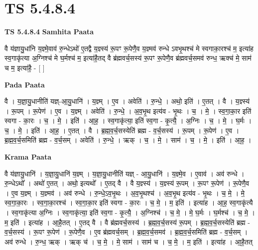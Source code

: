 \documentclass[17pt]{extarticle}
\begin{document}
\section{ TS 5.4.8.4 }

\textbf{TS 5.4.8.4 } \newline
\textbf{Samhita Paata} \newline

वै य॑ज्ञायु॒धा॑नि य॒ज्ञ्मे॒वाव॑ रु॒न्धेऽथो॑ ए॒तद्वै य॒ज्ञ्स्य॑ रू॒पꣳ रू॒पेणै॒व य॒ज्ञ्मव॑ रुन्धे ऽवभृ॒थश्च॑ मे स्वगाका॒रश्च॑ म॒ इत्या॑ह स्व॒गाकृ॑त्या अ॒ग्निश्च॑ मे घ॒र्मश्च॑ म॒ इत्या॑है॒तद् वै ब्र॑ह्मवर्च॒सस्य॑ रू॒पꣳ रू॒पेणै॒व ब्र॑ह्मवर्च॒समव॑ रुन्ध॒ ऋक्च॑ मे॒ साम॑ च म॒ इत्या॑है॒ - [  ] \newline

\textbf{Pada Paata} \newline

वै । य॒ज्ञा॒यु॒धानीति॑ यज्ञ्-आ॒यु॒धानि॑ । य॒ज्ञ्म् । ए॒व । अवेति॑ । रु॒न्धे॒ । अथो॒ इति॑ । ए॒तत् । वै । य॒ज्ञ्स्य॑ । रू॒पम् । रू॒पेण॑ । ए॒व । य॒ज्ञ्म् । अवेति॑ । रु॒न्धे॒ । अ॒व॒भृ॒थ इत्य॑व - भृ॒थः । च॒ । मे॒ । स्व॒गा॒का॒र इति॑ स्वगा - का॒रः । च॒ । मे॒ । इति॑ । आ॒ह॒ । स्व॒गाकृ॑त्या॒ इति॑ स्व॒गा - कृ॒त्यै॒ । अ॒ग्निः । च॒ । मे॒ । घ॒र्मः । च॒ । मे॒ । इति॑ । आ॒ह॒ । ए॒तत् । वै । ब्र॒ह्म॒व॒र्च॒सस्येति॑ ब्रह्म - व॒र्च॒सस्य॑ । रू॒पम् । रू॒पेण॑ । ए॒व । ब्र॒ह्म॒व॒र्च॒समिति॑ ब्रह्म - व॒र्च॒सम् । अवेति॑ । रु॒न्धे॒ । ऋक् । च॒ । मे॒ । साम॑ । च॒ । मे॒ । इति॑ । आ॒ह॒ ।  \newline


\textbf{Krama Paata} \newline

वै य॑ज्ञायु॒धानि॑ । य॒ज्ञा॒यु॒धानि॑ य॒ज्ञ्म् । य॒ज्ञा॒यु॒धानीति॑ यज्ञ् - आ॒यु॒धानि॑ । य॒ज्ञ्मे॒व । ए॒वाव॑ । अव॑ रुन्धे । रु॒न्धेऽथो᳚ । अथो॑ ए॒तत् । अथो॒ इत्यथो᳚ । ए॒तद् वै । वै य॒ज्ञ्स्य॑ । य॒ज्ञ्स्य॑ रू॒पम् । रू॒पꣳ रू॒पेण॑ । रू॒पेणै॒व । ए॒व य॒ज्ञ्म् । य॒ज्ञ्मव॑ । अव॑ रुन्धे । रु॒न्धे॒ऽव॒भृ॒थः । अ॒व॒भृ॒थश्च॑ । अ॒व॒भृ॒थ इत्य॑व - भृ॒थः । च॒ मे॒ । मे॒ स्व॒गा॒का॒रः । स्व॒गा॒का॒रश्च॑ । स्व॒गा॒का॒र इति॑ स्वगा - का॒रः । च॒ मे॒ । म॒ इति॑ । इत्या॑ह । आ॒ह॒ स्व॒गाकृ॑त्यै । स्व॒गाकृ॑त्या अ॒ग्निः । स्व॒गाकृ॑त्या॒ इति॑ स्व॒गा - कृ॒त्यै॒ । अ॒ग्निश्च॑ । च॒ मे॒ । मे॒ घ॒र्मः । घ॒र्मश्च॑ । च॒ मे॒ । म॒ इति॑ । इत्या॑ह । आ॒है॒तत् । ए॒तद् वै । वै ब्र॑ह्मवर्च॒सस्य॑ । ब्र॒ह्म॒व॒र्च॒सस्य॑ रू॒पम् । ब्र॒ह्म॒व॒र्च॒सस्येति॑ ब्रह्म - व॒र्च॒सस्य॑ । रू॒पꣳ रू॒पेण॑ । रू॒पेणै॒व । ए॒व ब्र॑ह्मवर्च॒सम् । ब्र॒ह्म॒व॒र्च॒समव॑ । ब्र॒ह्म॒व॒र्च॒समिति॑ ब्रह्म - व॒र्च॒सम् । अव॑ रुन्धे । रु॒न्ध॒ ऋक् । ऋक् च॑ । च॒ मे॒ । मे॒ साम॑ । साम॑ च । च॒ मे॒ । म॒ इति॑ । इत्या॑ह । आ॒है॒तत् \newline
\end{document}
